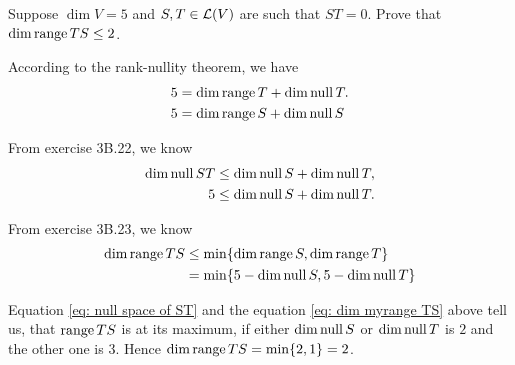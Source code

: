 \begin{xrcs}
  Suppose $\dim V = 5$ and $S, T \in \mathcal{L} (V)$ are such that $ST = 0$. Prove that $\dim \operatorname{range} TS \leq 2$.

  \begin{prf}
    According to the rank-nullity theorem, we have
    \begin{equation}
      \begin{aligned}
        5 &= \dim \operatorname{range} T + \dim \operatorname{null} T. \\
        5 &= \dim \operatorname{range} S + \dim \operatorname{null} S
      \end{aligned}
    \end{equation}

    From exercise 3B.22, we know
    \begin{equation}
      \begin{aligned}
        \label{eq:  null space of ST}
        \dim \operatorname{null} ST & \leq \dim \operatorname{null} S + \dim \operatorname{null} T, \\
        5 & \leq \dim \operatorname{null} S + \dim \operatorname{null} T.
      \end{aligned}
    \end{equation}

    From exercise 3B.23, we know
    \begin{equation}
      \begin{aligned}
        \label{eq: dim myrange TS}
        \dim \operatorname{range} TS & \leq \min \{ \dim \operatorname{range} S, \dim \operatorname{range} T\} \\
        & =     \min \{ 5 - \dim \operatorname{null} S, 5 - \dim \operatorname{null} T \}
      \end{aligned}
    \end{equation}

    Equation \eqref{eq: null space of ST} and the equation \eqref{eq: dim myrange TS} above tell us, that $\operatorname{range} TS$ is at its maximum, if either $\dim \operatorname{null} S$ or $\dim \operatorname{null} T$ is $2$ and the other one is $3$. Hence $\dim \operatorname{range} TS = \min \{2,1\} = 2$.
  \end{prf}
\end{xrcs}

